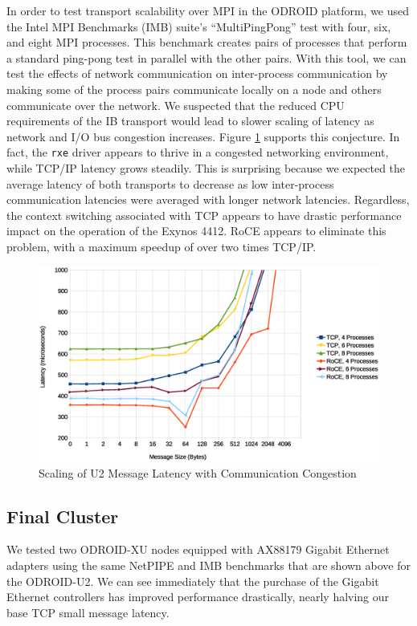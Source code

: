 \documentclass[11pt]{book}
\begin{document}
In order to test transport scalability over MPI in the ODROID platform, we used the Intel
MPI Benchmarks (IMB) suite's ``MultiPingPong'' test with four, six, and eight MPI
processes.  This benchmark creates pairs of processes that perform a standard ping-pong
test in parallel with the other pairs. With this tool, we can test the effects of network
communication on inter-process communication by making some of the process pairs
communicate locally on a node and others communicate over the network.  We suspected that
the reduced CPU requirements of the IB transport would lead to slower scaling of latency
as network and I/O bus congestion increases.  Figure \ref{multipingpong-u2} supports this
conjecture.  In fact, the \verb;rxe; driver appears to thrive in a congested networking
environment, while TCP/IP latency grows steadily.  This is surprising because we expected
the average latency of both transports to decrease as low inter-process communication
latencies were averaged with longer network latencies.  Regardless, the context switching
associated with TCP appears to have drastic performance impact on the operation of the
Exynos 4412.  RoCE appears to eliminate this problem, with a maximum speedup of over two
times TCP/IP.

\begin{figure}
\includegraphics[width=\textwidth]{pingpong_multi_zoom}
\caption{Scaling of U2 Message Latency with Communication Congestion}
\label{multipingpong-u2}
\end{figure}

\subsection{Final Cluster}\label{final-cluster-benchmarks}

We tested two ODROID-XU nodes equipped with AX88179 Gigabit Ethernet adapters using the
same NetPIPE and IMB benchmarks that are shown above for the ODROID-U2.  We can see
immediately that the purchase of the Gigabit Ethernet controllers has improved performance
drastically, nearly halving our base TCP small message latency.
\end{document}
